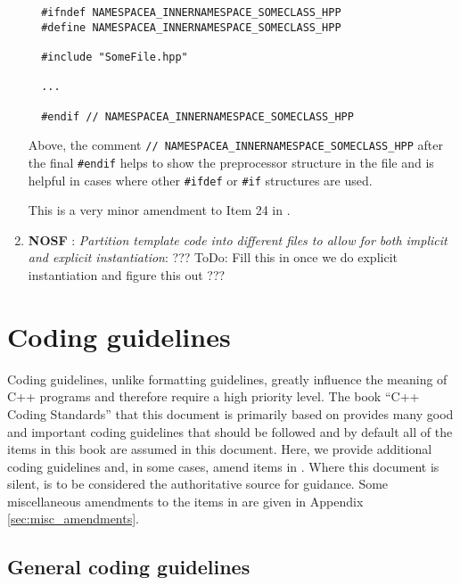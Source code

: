 \begin{enumerate}
{\begin{verbatim}
  #ifndef NAMESPACEA_INNERNAMESPACE_SOMECLASS_HPP
  #define NAMESPACEA_INNERNAMESPACE_SOMECLASS_HPP

  #include "SomeFile.hpp"

  ...

  #endif // NAMESPACEA_INNERNAMESPACE_SOMECLASS_HPP
\end{verbatim}}

Above, the comment {}\texttt{//
NAMESPACEA\-\_INNERNAMESPACE\-\_SOMECLASS\-\_HPP} after the final
{}\texttt{\#endif} helps to show the preprocessor structure in the file and is
helpful in cases where other {}\texttt{\#ifdef} or {}\texttt{\#if} structures
are used.

This is a very minor amendment to Item 24 in {}\cite{C++CodingStandards05}.

{}\item{}\textbf{NOSF }: {}
{}\textit{Partition template code into different files to allow for both
implicit and explicit instantiation}: ??? ToDo: Fill this in once we do
explicit instantiation and figure this out ???

\end{enumerate}

%
\section{Coding guidelines}
\label{thyracodingguidelines:codingguidelines:sec}
%

Coding guidelines, unlike formatting guidelines, greatly influence the meaning
of C++ programs and therefore require a high priority level.  The book ``C++
Coding Standards'' {}\cite{C++CodingStandards05} that this document is
primarily based on provides many good and important coding guidelines that
should be followed and by default all of the items in this book are assumed in
this document.  Here, we provide additional coding guidelines and, in some
cases, amend items in {}\cite{C++CodingStandards05}.  Where this document is
silent, {}\cite{C++CodingStandards05} is to be considered the authoritative
source for guidance.  Some miscellaneous amendments to the items in
{}\cite{C++CodingStandards05} are given in Appendix
{}\ref{sec:misc_amendments}.

%
\subsection{General coding guidelines}
%

